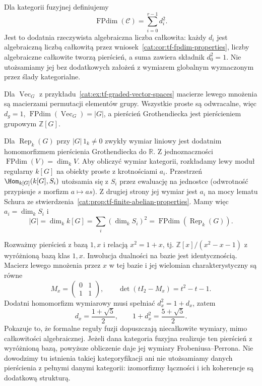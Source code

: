 \begin{definicja}\label{cat:def:tf-fpdim-category}
Dla kategorii fuzyjnej definiujemy
\[
 \operatorname{FPdim}(\mathcal C)=\sum_{i=0}^{r-1}d_i^2.
\]
Jest to dodatnia rzeczywista algebraiczna liczba całkowita: każdy $d_i$ jest algebraiczną liczbą całkowitą przez wniosek~\ref{cat:cor:tf-fpdim-properties}, liczby algebraiczne całkowite tworzą pierścień, a suma zawiera składnik $d_0^2=1$. Nie utożsamiamy jej bez dodatkowych założeń z wymiarem globalnym wyznaczonym przez ślady kategorialne.
\end{definicja}

\begin{przyklad}\label{cat:ex:tf-fpdim-group}
Dla $\operatorname{Vec}_G$ z przykładu~\ref{cat:ex:tf-graded-vector-spaces} macierze lewego mnożenia są macierzami permutacji elementów grupy. Wszystkie proste są odwracalne, więc $d_g=1$, $\operatorname{FPdim}(\operatorname{Vec}_G)=|G|$, a pierścień Grothendiecka jest pierścieniem grupowym $\mathbb Z[G]$.

Dla $\operatorname{Rep}_k(G)$ przy $|G|\,1_k\neq0$ zwykły wymiar liniowy jest dodatnim homomorfizmem pierścienia Grothendiecka do $\mathbb R$. Z jednoznaczności $\operatorname{FPdim}(V)=\dim_k V$. Aby obliczyć wymiar kategorii, rozkładamy lewy moduł regularny $k[G]$ na obiekty proste z krotnościami $a_i$. Przestrzeń $\Hom_{k[G]}(k[G],S_i)$ utożsamia się z $S_i$ przez ewaluację na jednostce (odwrotność przypisuje $s$ morfizm $a\mapsto as$). Z drugiej strony jej wymiar jest $a_i$ na mocy lematu Schura ze stwierdzenia~\ref{cat:prop:tf-finite-abelian-properties}. Mamy więc $a_i=\dim_k S_i$ i
\[
 |G|=\dim_k k[G]=\sum_i(\dim_k S_i)^2
 =\operatorname{FPdim}(\operatorname{Rep}_k(G)).
\]
\end{przyklad}

\begin{przyklad}\label{cat:ex:tf-fibonacci-ring}
Rozważmy pierścień z bazą $1,x$ i relacją $x^2=1+x$, tj. $\mathbb Z[x]/(x^2-x-1)$ z wyróżnioną bazą klas $1,x$. Inwolucja dualności na bazie jest identycznością. Macierz lewego mnożenia przez $x$ w tej bazie i jej wielomian charakterystyczny są równe
\[
 M_x=\begin{pmatrix}0&1\\1&1\end{pmatrix},
 \qquad \det(tI_2-M_x)=t^2-t-1.
\]
Dodatni homomorfizm wymiarowy musi spełniać $d_x^2=1+d_x$, zatem
\[
 d_x=\frac{1+\sqrt5}{2},\qquad 1+d_x^2=\frac{5+\sqrt5}{2}.
\]
Pokazuje to, że formalne reguły fuzji dopuszczają niecałkowite wymiary, mimo całkowitości algebraicznej. Jeżeli dana kategoria fuzyjna realizuje ten pierścień z wyróżnioną bazą, powyższe obliczenie daje jej wymiary Frobeniusa--Perrona. Nie dowodzimy tu istnienia takiej kategoryfikacji ani nie utożsamiamy danych pierścienia z pełnymi danymi kategorii: izomorfizmy łączności i ich koherencje są dodatkową strukturą.
\end{przyklad}

